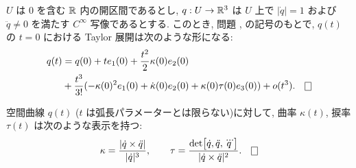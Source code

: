 \documentclass[12pt,twoside]{jarticle}
\begin{document}
\begin{question}
  $U$ は $0$ を含む ${\mathbb R}$ 内の開区間であるとし, $q : U \to {\mathbb R}^3$ は %
  $U$ 上で $|\dot{q}| = 1$ および $\ddot{q}\ne 0$ を満たす $C^\infty$ %
  写像であるとする. このとき,
  問題 ,  の記号のもとで, $q(t)$ の $t = 0$ %
  における Taylor 展開は次のような形になる:
  \begin{align*}
    q(t)
    & = q(0) + t e_1(0) + \frac{t^2}{2} \kappa(0)e_2(0)
    \\
    & + \frac{t^3}{3!}
    (-\kappa(0)^2 e_1(0) + \dot{\kappa}(0) e_2(0) + \kappa(0)\tau(0)e_3(0))
    + o(t^3).
    \qed
  \end{align*}
\end{question}

\begin{question}
  \label{q:kappa(t)-tau(t)}
  空間曲線 $q(t)$ ($t$ は弧長パラメーターとは限らない)に対して, 
  曲率 $\kappa(t)$, 捩率 $\tau(t)$ は次のような表示を持つ:
  \[
    \kappa 
    = 
    \frac{|\dot{q} \times \ddot{q}|}
         {|\dot{q}|^3},
    \qquad
    \tau 
    = 
    \frac{\det\bigl[\dot{q}, \ddot{q}, \dddot{q}\bigr]}
         {|\dot{q} \times \ddot{q}|^2}.
  \qed
  \]
\end{question}
\end{document}

